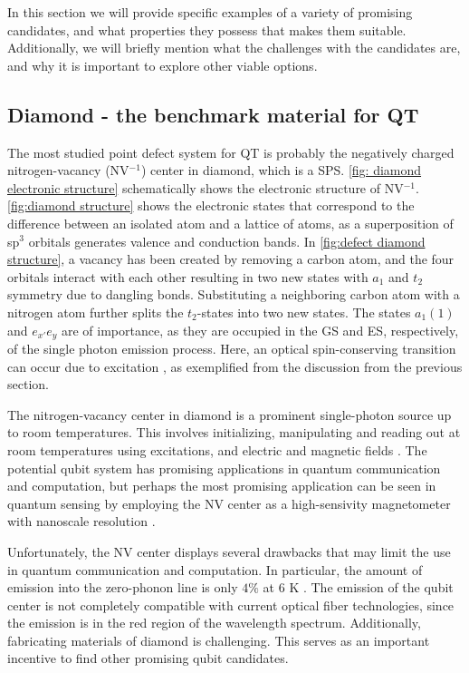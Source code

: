 In this section we will provide specific examples of a variety of promising candidates, and what properties they possess that makes them suitable. Additionally, we will briefly mention what the challenges with the candidates are, and why it is important to explore other viable options.

\subsection{Diamond - the benchmark material for QT}
\label{diamond}



The most studied point defect system for QT is probably the negatively charged nitrogen-vacancy (NV$^{-1}$) center in diamond, which is a SPS. \autoref{fig: diamond electronic structure} schematically shows the electronic structure of NV$^{-1}$. \autoref{fig:diamond structure} shows the electronic states that correspond to the difference between an isolated atom and a lattice of atoms, as a superposition of sp$^3$ orbitals generates valence and conduction bands.
In \autoref{fig:defect diamond structure}, a vacancy has been created by removing a carbon atom, and the four orbitals interact with each other resulting in two new states with $a_1$ and $t_2$ symmetry due to dangling bonds. Substituting a neighboring carbon atom with a nitrogen atom further splits the $t_2$-states into two new states.
The states $a_1(1)$ and $e_{x'}e_y$ are of importance, as they are occupied in the GS and ES, respectively, of the single photon emission process. Here, an optical spin-conserving transition can occur due to excitation \cite{Gordon2013}, as exemplified from the discussion from the previous section.

\noindent The nitrogen-vacancy center in diamond is a prominent single-photon source up to room temperatures. This involves initializing, manipulating and reading out at room temperatures using excitations, and electric and magnetic fields \cite{Gordon2013}. The potential qubit system has promising applications in quantum communication and computation, but
perhaps the most promising application can be seen in quantum sensing by employing the NV center as a high-sensivity magnetometer with nanoscale resolution \cite{Taylor2008}.

Unfortunately, the NV center displays several drawbacks that may limit the use in quantum communication and computation. In particular, the amount of emission into the zero-phonon line is only $4 \%$ at $6$ K \cite{Barclay2011}. The emission of the qubit center is not completely compatible with current optical fiber technologies, since the emission is in the red region of the wavelength spectrum. Additionally, fabricating materials of diamond is challenging. This serves as an important incentive to find other promising qubit candidates.


